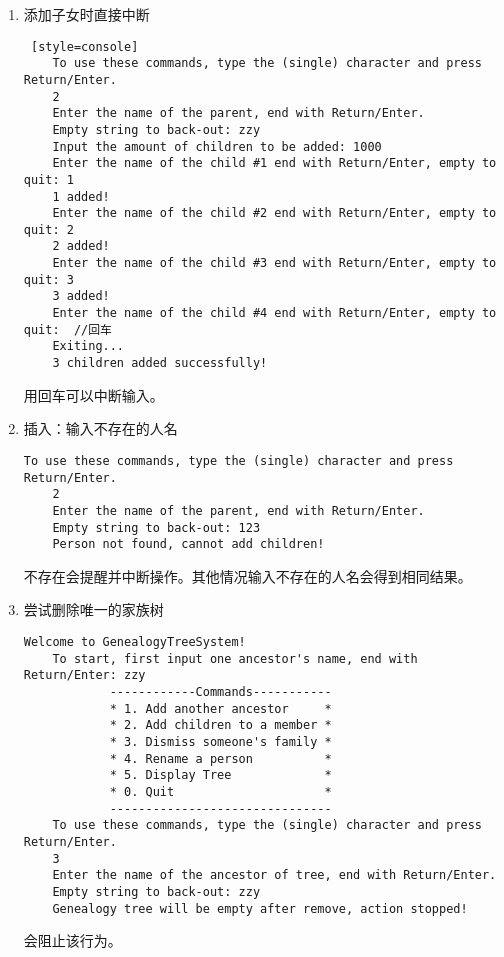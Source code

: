 \begin{enumerate}
    \item 添加子女时直接中断
\begin{lstlisting} [style=console]
    To use these commands, type the (single) character and press Return/Enter.
    2
    Enter the name of the parent, end with Return/Enter.
    Empty string to back-out: zzy
    Input the amount of children to be added: 1000
    Enter the name of the child #1 end with Return/Enter, empty to quit: 1
    1 added!
    Enter the name of the child #2 end with Return/Enter, empty to quit: 2
    2 added!
    Enter the name of the child #3 end with Return/Enter, empty to quit: 3
    3 added!
    Enter the name of the child #4 end with Return/Enter, empty to quit:  //回车
    Exiting...
    3 children added successfully!
\end{lstlisting}
    用回车可以中断输入。

    \item 插入：输入不存在的人名
\begin{lstlisting}[style=console]
    To use these commands, type the (single) character and press Return/Enter.
    2
    Enter the name of the parent, end with Return/Enter.
    Empty string to back-out: 123
    Person not found, cannot add children!
\end{lstlisting}
    不存在会提醒并中断操作。其他情况输入不存在的人名会得到相同结果。

    \item 尝试删除唯一的家族树
\begin{lstlisting}[style=console]
    Welcome to GenealogyTreeSystem!
    To start, first input one ancestor's name, end with Return/Enter: zzy
            ------------Commands-----------
            * 1. Add another ancestor     *
            * 2. Add children to a member *
            * 3. Dismiss someone's family *
            * 4. Rename a person          *
            * 5. Display Tree             *
            * 0. Quit                     *
            -------------------------------
    To use these commands, type the (single) character and press Return/Enter.
    3
    Enter the name of the ancestor of tree, end with Return/Enter.
    Empty string to back-out: zzy
    Genealogy tree will be empty after remove, action stopped!
\end{lstlisting}
    会阻止该行为。


\end{enumerate}